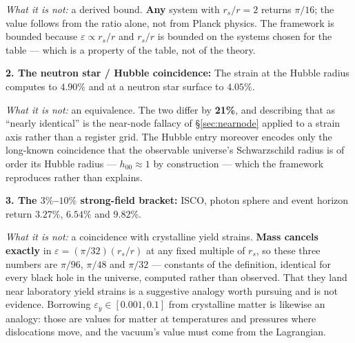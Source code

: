 \documentclass[11pt, letterpaper, openany]{book}
\begin{document}
\emph{What it is not:} a derived bound. \textbf{Any} system with $r_s/r = 2$ returns $\pi/16$; the
value follows from the ratio alone, not from Planck physics. The framework is bounded because
$\varepsilon \propto r_s/r$ and $r_s/r$ is bounded on the systems chosen for the table --- which is a
property of the table, not of the theory.

\textbf{2. The neutron star / Hubble coincidence:}
The strain at the Hubble radius computes to $4.90\%$ and at a neutron star surface to $4.05\%$.

\emph{What it is not:} an equivalence. The two differ by \textbf{21\%}, and describing that as
``nearly identical'' is the near-node fallacy of \S\ref{sec:nearnode} applied to a strain axis rather
than a register grid. The Hubble entry moreover encodes only the long-known coincidence that the
observable universe's Schwarzschild radius is of order its Hubble radius --- $h_{00} \approx 1$ by
construction --- which the framework reproduces rather than explains.

\textbf{3. The $3\%$--$10\%$ strong-field bracket:}
ISCO, photon sphere and event horizon return $3.27\%$, $6.54\%$ and $9.82\%$.

\emph{What it is not:} a coincidence with crystalline yield strains. \textbf{Mass cancels exactly} in
$\varepsilon = (\pi/32)(r_s/r)$ at any fixed multiple of $r_s$, so these three numbers are
$\pi/96$, $\pi/48$ and $\pi/32$ --- constants of the definition, identical for every black hole in
the universe, computed rather than observed. That they land near laboratory yield strains is a
suggestive analogy worth pursuing and is not evidence. Borrowing $\varepsilon_y \in [0.001, 0.1]$
from crystalline matter is likewise an analogy: those are values for matter at temperatures and
pressures where dislocations move, and the vacuum's value must come from the Lagrangian.
\end{document}
